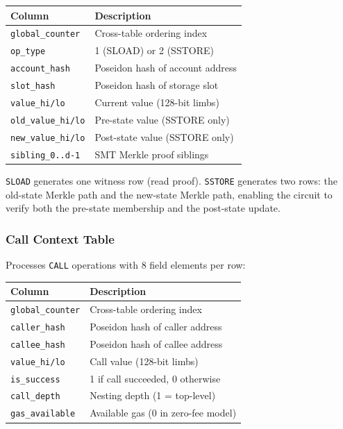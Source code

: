 \documentclass[conference]{IEEEtran}
\begin{document}
\begin{center}
\small
\begin{tabular}{ll}
\toprule
\textbf{Column} & \textbf{Description} \\
\midrule
\texttt{global\_counter} & Cross-table ordering index \\
\texttt{op\_type} & 1 (SLOAD) or 2 (SSTORE) \\
\texttt{account\_hash} & Poseidon hash of account address \\
\texttt{slot\_hash} & Poseidon hash of storage slot \\
\texttt{value\_hi/lo} & Current value (128-bit limbs) \\
\texttt{old\_value\_hi/lo} & Pre-state value (SSTORE only) \\
\texttt{new\_value\_hi/lo} & Post-state value (SSTORE only) \\
\texttt{sibling\_0..d-1} & SMT Merkle proof siblings \\
\bottomrule
\end{tabular}
\end{center}

\texttt{SLOAD} generates one witness row (read proof).
\texttt{SSTORE} generates two rows: the old-state Merkle path and the
new-state Merkle path, enabling the circuit to verify both the pre-state
membership and the post-state update.

\subsubsection{Call Context Table}
Processes \texttt{CALL} operations with 8 field elements per row:

\begin{center}
\small
\begin{tabular}{ll}
\toprule
\textbf{Column} & \textbf{Description} \\
\midrule
\texttt{global\_counter} & Cross-table ordering index \\
\texttt{caller\_hash} & Poseidon hash of caller address \\
\texttt{callee\_hash} & Poseidon hash of callee address \\
\texttt{value\_hi/lo} & Call value (128-bit limbs) \\
\texttt{is\_success} & 1 if call succeeded, 0 otherwise \\
\texttt{call\_depth} & Nesting depth (1 = top-level) \\
\texttt{gas\_available} & Available gas (0 in zero-fee model) \\
\bottomrule
\end{tabular}
\end{center}
\end{document}
